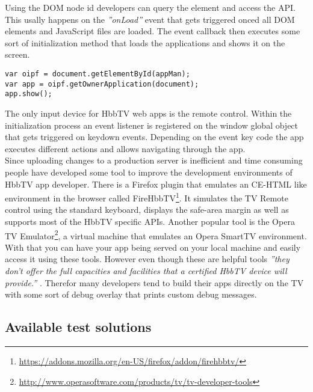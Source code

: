 Using the DOM node id developers can query the element and access the API. This usally happens
on the \textit{''onLoad''} event that gets triggered onced all DOM elements and JavaScript files
are loaded. The event callback then executes some sort of initialization method that loads the
applications and shows it on the screen.

\vspace{1cm}
\begin{lstlisting}[caption=HbbTV App initialization,label=loadApp]
var oipf = document.getElementById(appMan);
var app = oipf.getOwnerApplication(document);
app.show();
\end{lstlisting}
\vspace{0.5cm}

The only input device for HbbTV web apps is the remote control. Within the initialization process
an event listener is registered on the window global object that gets triggered on keydown events.
Depending on the event key code the app executes different actions and allows navigating through
the app.\\
Since uploading changes to a production server is inefficient and time consuming people have
developed some tool to improve the development environments of HbbTV app developer. There is a
Firefox plugin that emulates an CE-HTML like environment in the browser called FireHbbTV\footnote{\url{https://addons.mozilla.org/en-US/firefox/addon/firehbbtv/}}.
It simulates the TV Remote control using the standard keyboard, displays the safe-area margin as well
as supports most of the HbbTV specific APIs. Another popular tool is the Opera TV Emulator\footnote{\url{http://www.operasoftware.com/products/tv/tv-developer-tools}},
a virtual machine that emulates an Opera SmartTV environment. With that you can have your app being
served on your local machine and easily access it using these tools. However even though these are
helpful tools \textit{''they don't offer the full capacities and facilities that a certified HbbTV
device will provide.''} \cite{hbbtvenv}. Therefor many developers tend to build their apps directly
on the TV with some sort of debug overlay that prints custom debug messages.

\subsection{Available test solutions\label{sec:availabletestsolutions}}

